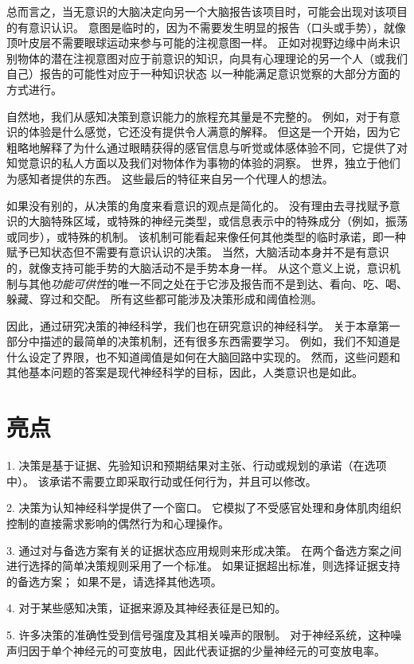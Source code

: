 总而言之，当无意识的大脑决定向另一个大脑报告该项目时，可能会出现对该项目的有意识认识。
意图是临时的，因为不需要发生明显的报告（口头或手势），就像顶叶皮层不需要眼球运动来参与可能的注视意图一样。
正如对视野边缘中尚未识别物体的潜在注视意图对应于前意识的知识，向具有心理理论的另一个人（或我们自己）报告的可能性对应于一种知识状态 以一种能满足意识觉察的大部分方面的方式进行。


自然地，我们从感知决策到意识能力的旅程充其量是不完整的。
例如，对于有意识的体验是什么感觉，它还没有提供令人满意的解释。
但这是一个开始，因为它粗略地解释了为什么通过眼睛获得的感官信息与听觉或体感体验不同，它提供了对知觉意识的私人方面以及我们对物体作为事物的体验的洞察。
世界，独立于他们为感知者提供的东西。
这些最后的特征来自另一个代理人的想法。


如果没有别的，从决策的角度来看意识的观点是简化的。
没有理由去寻找赋予意识的大脑特殊区域，或特殊的神经元类型，或信息表示中的特殊成分（例如，振荡或同步），或特殊的机制。
该机制可能看起来像任何其他类型的临时承诺，即一种赋予已知状态但不需要有意识认识的决策。
当然，大脑活动本身并不是有意识的，就像支持可能手势的大脑活动不是手势本身一样。
从这个意义上说，意识机制与其他\textit{功能可供性}的唯一不同之处在于它涉及报告而不是到达、看向、吃、喝、躲藏、穿过和交配。
所有这些都可能涉及决策形成和阈值检测。


因此，通过研究决策的神经科学，我们也在研究意识的神经科学。
关于本章第一部分中描述的最简单的决策机制，还有很多东西需要学习。
例如，我们不知道是什么设定了界限，也不知道阈值是如何在大脑回路中实现的。
然而，这些问题和其他基本问题的答案是现代神经科学的目标，因此，人类意识也是如此。



\section{亮点}

1. 决策是基于证据、先验知识和预期结果对主张、行动或规划的承诺（在选项中）。
该承诺不需要立即采取行动或任何行为，并且可以修改。 


2. 决策为认知神经科学提供了一个窗口。
它模拟了不受感官处理和身体肌肉组织控制的直接需求影响的偶然行为和心理操作。


3. 通过对与备选方案有关的证据状态应用规则来形成决策。
在两个备选方案之间进行选择的简单决策规则采用了一个标准。
如果证据超出标准，则选择证据支持的备选方案；
如果不是，请选择其他选项。


4. 对于某些感知决策，证据来源及其神经表征是已知的。


5. 许多决策的准确性受到信号强度及其相关噪声的限制。
对于神经系统，这种噪声归因于单个神经元的可变放电，因此代表证据的少量神经元的可变放电率。


